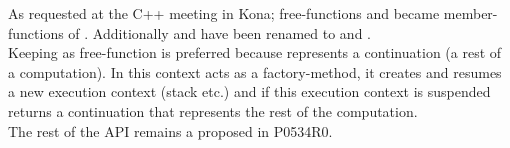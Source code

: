 
As requested at the C++ meeting in Kona; free-functions \getdata and \dataavail
became member-functions of \cont. Additionally  and
 have been renamed to \resume and
\resumewith.\\
\newline
Keeping \callcc as free-function is preferred because \cont represents a
continuation (a rest of a computation). In this context \callcc acts as a
factory-method, it creates and resumes a new execution context (stack etc.)
and if this execution context is suspended \callcc returns a continuation that
represents the rest of the computation.\\
The rest of the API remains a proposed in P0534R0\cite{P0534R0}.
